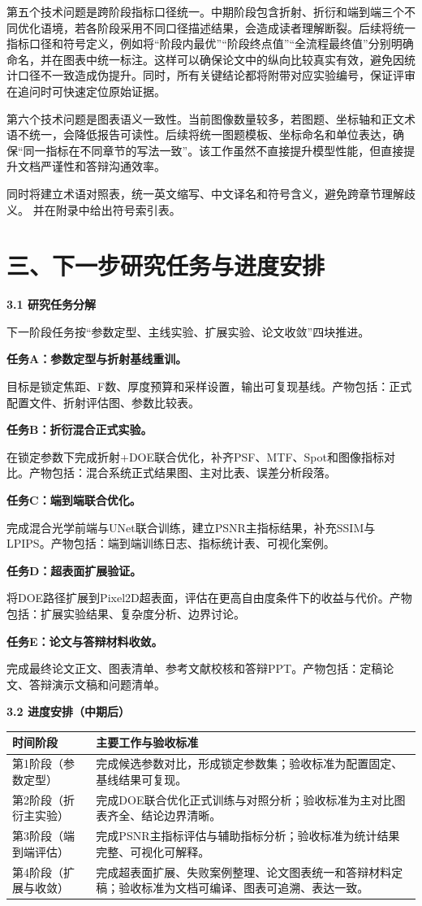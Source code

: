 \documentclass[UTF8,12pt,fontset=fandol]{ctexart}
\newcommand{\hfirst}[1]{%
\vspace{0.6em}
\noindent\textbf{#1}\par
}
\newcommand{\subh}[1]{%
\vspace{0.4em}
\noindent\textbf{#1}\par
}
\begin{document}
第五个技术问题是跨阶段指标口径统一。中期阶段包含折射、折衍和端到端三个不同优化语境，若各阶段采用不同口径描述结果，会造成读者理解断裂。后续将统一指标口径和符号定义，例如将“阶段内最优”“阶段终点值”“全流程最终值”分别明确命名，并在图表中统一标注。这样可以确保论文中的纵向比较真实有效，避免因统计口径不一致造成伪提升。同时，所有关键结论都将附带对应实验编号，保证评审在追问时可快速定位原始证据。

第六个技术问题是图表语义一致性。当前图像数量较多，若图题、坐标轴和正文术语不统一，会降低报告可读性。后续将统一图题模板、坐标命名和单位表达，确保“同一指标在不同章节的写法一致”。该工作虽然不直接提升模型性能，但直接提升文档严谨性和答辩沟通效率。

同时将建立术语对照表，统一英文缩写、中文译名和符号含义，避免跨章节理解歧义。
并在附录中给出符号索引表。

\section*{三、下一步研究任务与进度安排}

\hfirst{3.1 研究任务分解}
下一阶段任务按“参数定型、主线实验、扩展实验、论文收敛”四块推进。

\subh{任务A：参数定型与折射基线重训。}
目标是锁定焦距、F数、厚度预算和采样设置，输出可复现基线。产物包括：正式配置文件、折射评估图、参数比较表。

\subh{任务B：折衍混合正式实验。}
在锁定参数下完成折射+DOE联合优化，补齐PSF、MTF、Spot和图像指标对比。产物包括：混合系统正式结果图、主对比表、误差分析段落。

\subh{任务C：端到端联合优化。}
完成混合光学前端与UNet联合训练，建立PSNR主指标结果，补充SSIM与LPIPS。产物包括：端到端训练日志、指标统计表、可视化案例。

\subh{任务D：超表面扩展验证。}
将DOE路径扩展到Pixel2D超表面，评估在更高自由度条件下的收益与代价。产物包括：扩展实验结果、复杂度分析、边界讨论。

\subh{任务E：论文与答辩材料收敛。}
完成最终论文正文、图表清单、参考文献校核和答辩PPT。产物包括：定稿论文、答辩演示文稿和问题清单。

\hfirst{3.2 进度安排（中期后）}
\begin{longtable}{p{3.2cm}p{10.2cm}}
\toprule
时间阶段 & 主要工作与验收标准 \\
\midrule
第1阶段（参数定型） & 完成候选参数对比，形成锁定参数集；验收标准为配置固定、基线结果可复现。 \\
第2阶段（折衍主实验） & 完成DOE联合优化正式训练与对照分析；验收标准为主对比图表齐全、结论边界清晰。 \\
第3阶段（端到端评估） & 完成PSNR主指标评估与辅助指标分析；验收标准为统计结果完整、可视化可解释。 \\
第4阶段（扩展与收敛） & 完成超表面扩展、失败案例整理、论文图表统一和答辩材料定稿；验收标准为文档可编译、图表可追溯、表达一致。 \\
\bottomrule
\end{longtable}
\end{document}
